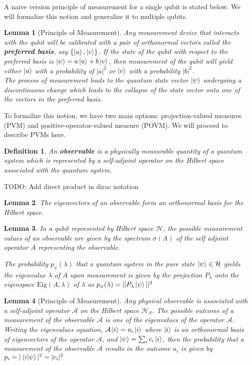 \documentclass[12pt,twoside,fleqn]{report}
\theoremstyle{thmstyle}
\newtheorem{defn}{Definition}[chapter]
\newtheorem{lemma}{Lemma}[chapter]
\begin{document}
A naive version principle of measurement for a single qubit is stated below. We will formalize this notion and generalize it to multiple qubits.
\begin{lemma}[Principle of Measurement]
    Any measurement device that interacts with the qubit will be calibrated with a pair of orthonormal vectors called the \textbf{preferred basis}, say $\{ \ket{u}, \ket{v} \}$. If the state of the qubit with respect to the preferred basis is $\ket{\psi} = a \ket{u} + b \ket{v}$, then measurement of the qubit will yield either $\ket{u}$ with a probability of $|a|^2$ or $\ket{v}$ with a probability $|b|^2$. \\
The process of measurement leads to the quantum state vector $\ket{\psi}$ undergoing a discontinuous change which leads to the collapse of the state vector onto one of the vectors in the preferred basis.
\end{lemma}

To formalize this notion, we have two main options: projection-valued measures (PVM) and positive-operator-valued measure (POVM). We will proceed to describe PVMs here.

\begin{defn}
    An \textbf{observable} is a physically measurable quantity of a quantum system which is represented by a self-adjoint operator on the Hilbert space associated with the quantum system.
\end{defn}

TODO: Add direct product in dirac notation


\begin{lemma}
    The eigenvectors of an observable form an orthonormal basis for the Hilbert space.
\end{lemma}

\begin{lemma}
    In a qubit represented by Hilbert space $\mathcal{H}$, the possible measurement values of an observable are given by the spectrum $\sigma(A)$ of the self adjoint operator $A$ representing the observable.

    The probability $p_\psi(\lambda)$ that a quantum system in the pure state $\ket{\psi} \in \mathcal{H}$ yields the eigenvalue $\lambda$ of $A$ upon measurement is given by the projection $P_\lambda$ onto the eigenspace $\text{Eig}(A, \lambda)$ of $\lambda$ as $p_\psi(\lambda) = || P_\lambda \ket{\psi} ||^2$
\end{lemma}

\begin{lemma}[Principle of Measurement]
Any physical observable is associated with a self-adjoint operator $\mathcal{A}$ on the Hilbert space $\mathcal{H}_S$. The possible outcome of a measurement of the observable $\mathcal{A}$ is one of the eigenvalues of the operator $\mathcal{A}$. \\
Writing the eigenvalues equation, $\mathcal{A} \ket{i} = a_i \ket{i}$ where $\ket{i}$ is an orthonormal basis of eigenvectors of the operator $\mathcal{A}$, and  $\ket{\psi} = \sum_i c_i \ket{i}$,  then the probability that a measurement of the observable $\mathcal{A}$ results in the outcome $a_i$ is given by $p_i = |\braket{i|\psi}|^2 = |c_i|^2$
\end{lemma}
\end{document}
